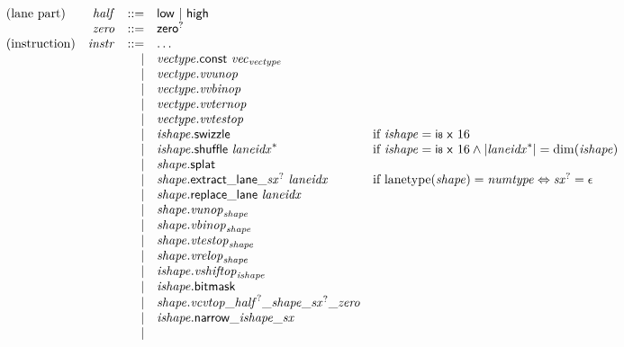 $$\begin{array}{@{}lrrl@{}l@{}}
\mbox{(lane part)} & {\mathit{half}} &::=& \mathsf{low} ~|~ \mathsf{high} \\
& {\mathit{zero}} &::=& {\mathsf{zero}^?} \\
\mbox{(instruction)} & {\mathit{instr}} &::=& \dots \\ &&|&
{\mathit{vectype}}.\mathsf{const}~{{\mathit{vec}}}_{{\mathit{vectype}}} \\ &&|&
{\mathit{vectype}} . {\mathit{vvunop}} \\ &&|&
{\mathit{vectype}} . {\mathit{vvbinop}} \\ &&|&
{\mathit{vectype}} . {\mathit{vvternop}} \\ &&|&
{\mathit{vectype}} . {\mathit{vvtestop}} \\ &&|&
{\mathit{ishape}}.\mathsf{swizzle} &\quad
  \mbox{if}~{\mathit{ishape}} = \mathsf{i{\scriptstyle8}}~\mathsf{x}~16 \\ &&|&
{\mathit{ishape}}.\mathsf{shuffle}~{{\mathit{laneidx}}^\ast} &\quad
  \mbox{if}~{\mathit{ishape}} = \mathsf{i{\scriptstyle8}}~\mathsf{x}~16 \land {|{{\mathit{laneidx}}^\ast}|} = {\mathrm{dim}}({\mathit{ishape}}) \\ &&|&
{\mathit{shape}}.\mathsf{splat} \\ &&|&
{{\mathit{shape}}.\mathsf{extract\_lane\_}}{{{\mathit{sx}}^?}}~{\mathit{laneidx}} &\quad
  \mbox{if}~{\mathrm{lanetype}}({\mathit{shape}}) = {\mathit{numtype}} \Leftrightarrow {{\mathit{sx}}^?} = \epsilon \\ &&|&
{\mathit{shape}}.\mathsf{replace\_lane}~{\mathit{laneidx}} \\ &&|&
{\mathit{shape}} . {{\mathit{vunop}}}_{{\mathit{shape}}} \\ &&|&
{\mathit{shape}} . {{\mathit{vbinop}}}_{{\mathit{shape}}} \\ &&|&
{\mathit{shape}} . {{\mathit{vtestop}}}_{{\mathit{shape}}} \\ &&|&
{\mathit{shape}} . {{\mathit{vrelop}}}_{{\mathit{shape}}} \\ &&|&
{\mathit{ishape}} . {{\mathit{vshiftop}}}_{{\mathit{ishape}}} \\ &&|&
{\mathit{ishape}}.\mathsf{bitmask} \\ &&|&
{\mathit{shape}} . {{{{{{{{{\mathit{vcvtop}}}{\mathsf{\_}}}{{{\mathit{half}}^?}}}{\mathsf{\_}}}{{\mathit{shape}}}}{\mathsf{\_}}}{{{\mathit{sx}}^?}}}{\mathsf{\_}}}{{\mathit{zero}}} \\ &&|&
{{{{{\mathit{ishape}}.\mathsf{narrow}}{\mathsf{\_}}}{{\mathit{ishape}}}}{\mathsf{\_}}}{{\mathit{sx}}} \\ &&|&

\end{array}$$
